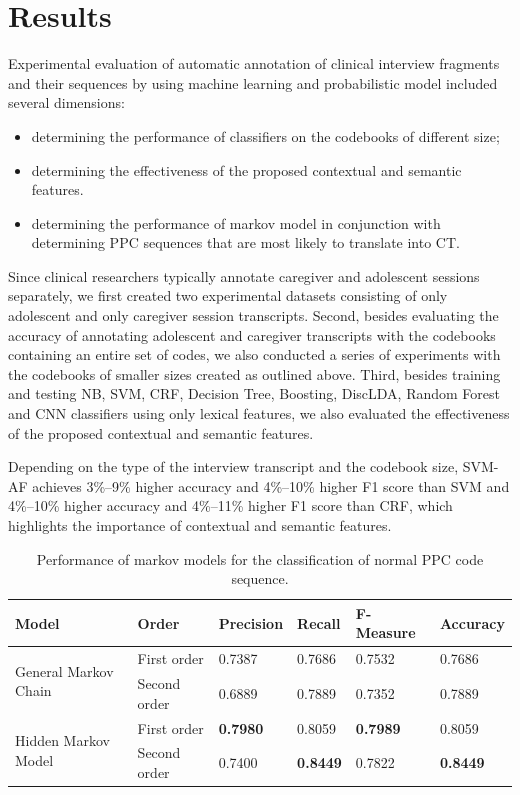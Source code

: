 \documentclass{amia}
\begin{document}
\section*{Results}
Experimental evaluation of automatic annotation of clinical interview fragments and their sequences by using machine learning and probabilistic model included several dimensions:
\begin{itemize}
\item determining the performance of classifiers on the codebooks of different size;
\item determining the effectiveness of the proposed contextual and semantic features.
\item determining the performance of markov model in conjunction with determining PPC sequences that are most likely to translate into CT.
\end{itemize}

Since clinical researchers typically annotate caregiver and adolescent sessions separately, we first created two experimental datasets consisting of only adolescent and only caregiver session transcripts. Second, besides evaluating the accuracy of annotating adolescent and caregiver transcripts with the codebooks containing an entire set of codes, we also conducted a series of experiments with the codebooks of smaller sizes created as outlined above. Third, besides training and testing NB, SVM, CRF, Decision Tree, Boosting, DiscLDA, Random Forest and CNN classifiers using only lexical features, we also evaluated the effectiveness of the proposed contextual and semantic features.

Depending on the type of the interview transcript and the codebook size, SVM-AF achieves 3\%--9\% higher accuracy and 4\%--10\% higher F1 score than SVM and 4\%--10\% higher accuracy and 4\%--11\% higher F1 score than CRF, which highlights the importance of contextual and semantic features. \\

\begin{table}[h]
\centering
\caption{Performance of markov models for the classification of normal PPC code sequence.}
\label{tab:result_norm_seq}
  \begin{tabular}{|l|l|l|l|l|l|}
  \hline
   \textbf{Model} & \textbf{Order}  & \textbf{Precision}  & \textbf{Recall} & \textbf{F-Measure} & \textbf{Accuracy}\\ \hline    
    
 \multirow{2}{*}{General Markov Chain} & First order & 0.7387 & 0.7686 & 0.7532 & 0.7686\\\cline{2-6}
 & Second order & 0.6889 & 0.7889 & 0.7352 & 0.7889\\ \hline
 \multirow{2}{*}{Hidden Markov Model} & First order & \textbf{0.7980} & 0.8059 & \textbf{0.7989} & 0.8059\\ \cline{2-6}
 & Second order & 0.7400 & \textbf{0.8449} & 0.7822  & \textbf{0.8449}\\ \hline
 
  \end{tabular}
\end{table}
\end{document}
